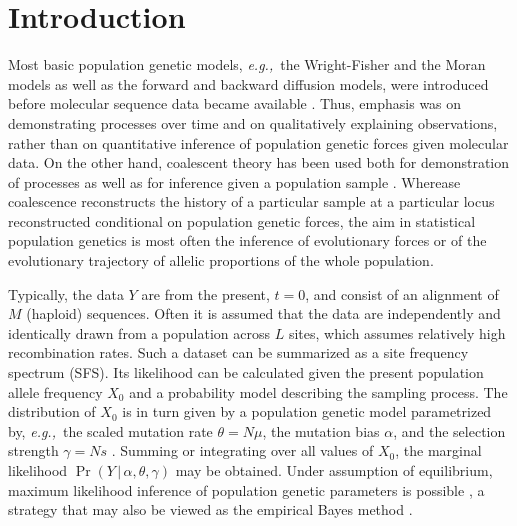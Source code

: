 \documentclass[preprint]{elsarticle}
\newcommand\given{{\,|\,}}
\newcommand\eg{{\it e.g.,}}
\begin{document}
\linenumbers

\listoftodos

\section{Introduction}

Most basic population genetic models, \eg\ the Wright-Fisher and the Moran models as well as the forward and backward diffusion models, were introduced before molecular sequence data became available \citep{Ewen04}. Thus, emphasis was on demonstrating processes over time and on qualitatively explaining observations, rather than on quantitative inference of population genetic forces given molecular data. On the other hand, coalescent theory \citep{King82} has been used both for demonstration of processes as well as for inference given a population sample \citep{Hein05,Wake09}. Wherease coalescence reconstructs the history of a particular sample at a particular locus reconstructed conditional on population genetic forces, the aim in statistical population genetics is most often the inference of evolutionary forces or of the evolutionary trajectory of allelic proportions of the whole population.


Typically, the data $Y$ are from the present, $t=0$, and consist of an alignment of $M$ (haploid) sequences. Often it is assumed that the data are independently and identically drawn from a population across $L$ sites, which assumes relatively high recombination rates. Such a dataset can be summarized as a site frequency spectrum (SFS). Its likelihood can be calculated given the present population allele frequency $X_0$ and a probability model describing the sampling process. The distribution of $X_0$ is in turn given by a population genetic model parametrized by, \eg\ the scaled mutation rate $\theta=N\mu$, the mutation bias $\alpha$, and the selection strength $\gamma=Ns$ \citep[\eg][]{Vogl15}. Summing or integrating over all values of $X_0$, the marginal likelihood $\Pr(Y\given \alpha,\theta,\gamma)$ may be obtained. Under assumption of equilibrium, maximum likelihood inference of population genetic parameters is possible \citep{Vogl14b,Vogl15}, a strategy that may also be viewed as the empirical Bayes method \citep[\eg][]{Carl00}. 
\end{document}
